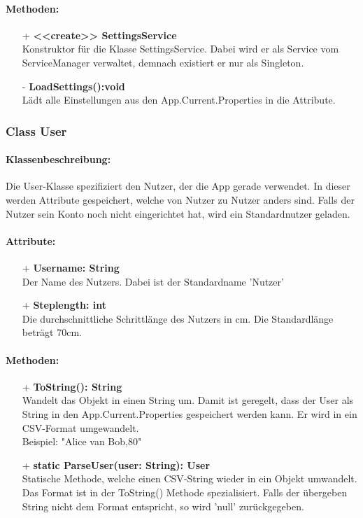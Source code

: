 \documentclass[a4paper,12pt]{article}
\begin{document}
	\paragraph{Methoden:}
	\begin{itemize}
		\item[+] \textbf{<<create>> SettingsService}\\Konstruktor für die Klasse SettingsService. Dabei wird er als Service vom ServiceManager verwaltet, demnach existiert er nur als Singleton.
		\item[-] \textbf{LoadSettings():void}\\Lädt alle Einstellungen aus den App.Current.Properties in die Attribute.	
	\end{itemize}
\subsubsection{Class User}
	\paragraph{Klassenbeschreibung:}
	Die User-Klasse spezifiziert den Nutzer, der die App gerade verwendet. In dieser werden Attribute gespeichert, welche von Nutzer zu Nutzer anders sind. Falls der Nutzer sein Konto noch nicht eingerichtet hat, wird ein Standardnutzer geladen.\\
	\paragraph{Attribute:}
	\begin{itemize}
		\item[+] \textbf{Username: String}\\Der Name des Nutzers. Dabei ist der Standardname 'Nutzer'\\
		\item[+] \textbf{Steplength: int}\\Die durchschnittliche Schrittlänge des Nutzers in cm. Die Standardlänge beträgt 70cm.\\
	\end{itemize}
	\paragraph{Methoden:}
	\begin{itemize}
		\item[+] \textbf{ToString(): String}\\Wandelt das Objekt in einen String um. Damit ist geregelt, dass der User als String in den App.Current.Properties gespeichert werden kann. Er wird in ein \Gls{CSV}-Format umgewandelt.\\
		Beispiel: "Alice van Bob,80"\\
		\item[+] \textbf{static ParseUser(user: String): User}\\Statische Methode, welche einen \Gls{CSV}-String wieder in  ein Objekt umwandelt. Das Format ist in der ToString() Methode spezialisiert. Falls der übergeben String nicht dem Format entspricht, so wird 'null' zurückgegeben.\\
	\end{itemize}
\end{document}
